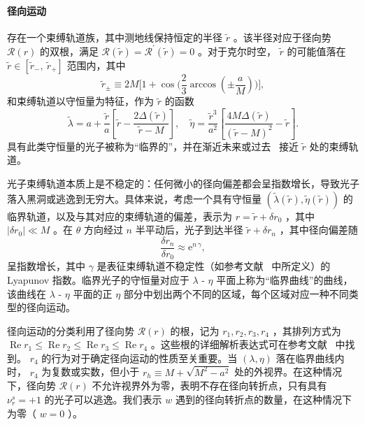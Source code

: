 \documentclass[aps,reprint,superscriptaddress,nofootinbib,floatfix,longbibliography,preprintnumbers]{revtex4-1}
\newcommand{\ee}{\mathrm{e}}
\begin{document}
   \paragraph{径向运动  }    存在一个束缚轨道族，其中测地线保持恒定的半径    $\tilde{r}$    。该半径对应于径向势    $\mathcal{R}(r)$    的双根，满足
   $\mathcal{R}(\tilde{r})=\mathcal{R}^{\prime}(\tilde{r})=0$    。对于克尔时空，    $\tilde{r}$    的可能值落在    $\tilde{r}\in[\tilde{r}_-, \  \tilde{r}_+]$    范围内，其中
   \begin{equation}
        \tilde{r}_{\pm} \equiv 2M\bigg[1+\cos\bigg(\frac{2}{3}\arccos\left(\pm\frac{a}{M}\right)\bigg)\bigg],
        \label{eq:bound radius range}
    \end{equation}    和束缚轨道以守恒量为特征，作为    $\tilde{r}$    的函数 
   \begin{equation}
        \tilde{\lambda}=a+\frac{\tilde{r}}{a}\left[\tilde{r}-\frac{2\Delta(\tilde{r})}{\tilde{r}-M}\right], \quad
        \tilde{\eta}=\frac{\tilde{r}^3}{a^2}\left[\frac{4M\Delta(\tilde{r})}{(\tilde{r}-M)^2}-\tilde{r}\right]. \label{eq:lamda eta c}
    \end{equation}    具有此类守恒量的光子被称为“临界的”，并在渐近未来或过去~    \cite{Gralla:2019drh}    接近    $\tilde{r}$    处的束缚轨道。  

光子束缚轨道本质上是不稳定的：任何微小的径向偏差都会呈指数增长，导致光子落入黑洞或逃逸到无穷大。具体来说，考虑一个具有守恒量    $(\tilde{\lambda}(\tilde{r}), \tilde{\eta}(\tilde{r}))$    的临界轨道，以及与其对应的束缚轨道的偏差，表示为    $r = \tilde{r} + \delta r_0$    ，其中    $\left|\delta r_0\right| \ll M$    。在    $\theta$    方向经过    $n$    半平动后，光子到达半径    $\tilde{r} + \delta r_n$    ，其中径向偏差随
   \begin{equation}
    \frac{\delta r_n}{\delta r_0}\approx \ee^{n\,\gamma},
\end{equation}    呈指数增长，其中    $\gamma$    是表征束缚轨道不稳定性（如参考文献~    \cite{Cardoso:2008bp,Gralla:2019drh}    中所定义）的 Lyapunov 指数。临界光子的守恒量对应于    $\lambda$    -    $\eta$    平面上称为“临界曲线”的曲线，该曲线在    $\lambda$    -    $\eta$    平面的正    $\eta$    部分中划出两个不同的区域，每个区域对应一种不同类型的径向运动。  

径向运动的分类利用了径向势    $\mathcal{R}(r)$    的根，记为    ${r_1, r_2, r_3, r_4}$    ，其排列方式为
   $\operatorname{Re}r_1\leq\operatorname{Re}r_2\leq\operatorname{Re}r_3\leq\operatorname{Re}r_4$    。这些根的详细解析表达式可在参考文献~    \cite{Gralla:2019ceu}    中找到。   $r_4$    的行为对于确定径向运动的性质至关重要。当    $(\lambda, \eta)$    落在临界曲线内时，   $r_4$    为复数或实数，但小于    $r_h \equiv M + \sqrt{M^2 - a^2}$    处的外视界。在这种情况下，径向势    $\mathcal{R}(r)$    不允许视界外为零，表明不存在径向转折点，只有具有    $\nu_r^s = +1$    的光子可以逃逸。我们表示    $w$    遇到的径向转折点的数量，在这种情况下为零（   $w = 0$   ）。  
\end{document}
